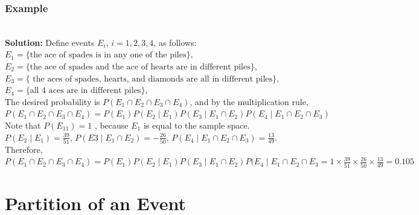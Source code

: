 \documentclass[compress]{beamer}
\begin{document}
\begin{frame}\frametitle{Example}
\\
\pause
\vspace{.9in}
{\tiny {\bf Solution:}  
Define events $E_i$, $i =1, 2, 3, 4$, as follows:
$E_1 = \{\text{the ace of spades is in any one of the piles}\},$\\
$E_2 = \{\text{the ace of spades and the ace of hearts are in different piles}\},$\\
$E_3 = \{\text{ the aces of spades, hearts, and diamonds are all in different piles}\},$\\
$E_4 = \{\text{all 4 aces are in different piles}\},$\\

The desired probability is $P(E_1\cap E_2 \cap E_3 \cap E_4)$, and by the multiplication rule,
$P(E_1\cap E_2 \cap E_3 \cap E_4)=P(E_1) P( E_2\mid  E_1)P(E_3 \mid E_1 \cap E_2) P(   E_4 \mid E_1\cap E_2 \cap E_3 ) $\\
Note that 
$P(E_11) = 1$ ,  because $E_1$ is equal to the sample space.
$P(E_2\mid E_1) = \frac{39}{51}$, $P(E3\mid E_1 \cap  E_2) =-\frac{26}{50}$,  $P(E_4 \mid E_1\cap E_2 \cap E_3) = \frac{13}{49}.$\\ Therefore, 
$P(E_1\cap E_2 \cap E_3 \cap E_4)=P(E_1) P( E_2\mid  E_1)P(E_3 \mid E_1 \cap E_2) P(   E_4 \mid E_1\cap E_2 \cap E_3 =1 \times   \frac{39}{51}\times \frac{26}{50} \times  \frac{13}{49}  = 0.105$
}
\vspace{2in}

\end{frame}





\section{ Partition of an Event }
\end{document}
